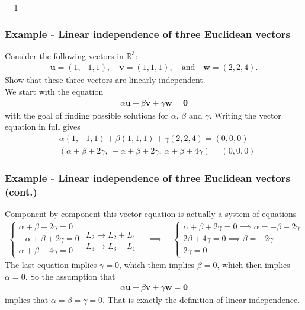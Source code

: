 \documentclass[usenames,dvipsnames,aspectratio=169,10pt]{beamer}
\def \EXAMPLEVERSION {3} %
\numberwithin{equation}{section}
\begin{document}
\ifnum \EXAMPLEVERSION = 1
\begin{frame}
\frametitle{Example - Linear independence of three Euclidean vectors}

\noindent Consider the following vectors in $\mathbb{R}^3$:
\begin{align*}
\mathbf{u} = (1,-1,1), \quad \mathbf{v} = (1,1,1), \quad \text{and} \quad \mathbf{w} = (2,2,4).
\end{align*}
Show that these three vectors are linearly independent. \\

\noindent We start with the equation
\begin{align*}
\alpha \mathbf{u} + \beta \mathbf{v} + \gamma \mathbf{w} = \mathbf{0}
\end{align*}
with the goal of finding possible solutions for $\alpha$, $\beta$ and $\gamma$. Writing the vector equation in full gives
\begin{align*}
& \alpha (1,-1,1) + \beta (1,1,1) + \gamma (2,2,4) = (0,0,0) \\
& (\alpha + \beta + 2\gamma, \, -\alpha + \beta + 2\gamma, \, \alpha + \beta + 4 \gamma) = (0,0,0)
\end{align*}
\end{frame}






\begin{frame}
\frametitle{Example - Linear independence of three Euclidean vectors (cont.)}
Component by component this vector equation is actually a system of equations
\begin{align*}
\begin{cases}
\alpha + \beta + 2\gamma = 0 \\
-\alpha + \beta + 2\gamma = 0 \\
\alpha + \beta + 4\gamma = 0 
\end{cases}
\begin{matrix}
 \\
 L_2 \to L_2 + L_1 \\
 L_3 \to L_3 - L_1
\end{matrix}
 \quad \implies \quad
\begin{cases}
\alpha + \beta + 2\gamma = 0 \implies \alpha = -\beta - 2\gamma \\
2\beta + 4\gamma = 0 \implies \beta = -2 \gamma \\
2\gamma = 0
\end{cases} 
\end{align*}
The last equation implies $\gamma=0$, which them implies $\beta=0$, which then implies $\alpha=0$. So the assumption that 
\begin{align*}
\alpha \mathbf{u} + \beta \mathbf{v} + \gamma \mathbf{w} = \mathbf{0}
\end{align*}
implies that $\alpha=\beta=\gamma=0$. That is exactly the definition of linear independence.
\end{frame}
\fi 
\end{document}
